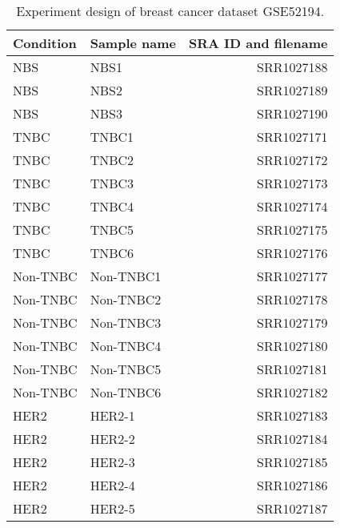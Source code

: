 \begin{table}[!htbp]
    \caption[Experiment design of breast cancer GSE52194]{
        Experiment design of breast cancer dataset GSE52194.
    }
    \label{tab:dataset-breast}
    \centering
    \begin{threeparttable}
        \begin{tabular}{llr}
            \toprule
            Condition & Sample name & SRA ID and filename \\
            \midrule
            NBS      & NBS1      & SRR1027188 \\
            NBS      & NBS2      & SRR1027189 \\
            NBS      & NBS3      & SRR1027190 \\
            TNBC     & TNBC1     & SRR1027171 \\
            TNBC     & TNBC2     & SRR1027172 \\
            TNBC     & TNBC3     & SRR1027173 \\
            TNBC     & TNBC4     & SRR1027174 \\
            TNBC     & TNBC5     & SRR1027175 \\
            TNBC     & TNBC6     & SRR1027176 \\
            Non-TNBC & Non-TNBC1 & SRR1027177 \\
            Non-TNBC & Non-TNBC2 & SRR1027178 \\
            Non-TNBC & Non-TNBC3 & SRR1027179 \\
            Non-TNBC & Non-TNBC4 & SRR1027180 \\
            Non-TNBC & Non-TNBC5 & SRR1027181 \\
            Non-TNBC & Non-TNBC6 & SRR1027182 \\
            HER2     & HER2-1    & SRR1027183 \\
            HER2     & HER2-2    & SRR1027184 \\
            HER2     & HER2-3    & SRR1027185 \\
            HER2     & HER2-4    & SRR1027186 \\
            HER2     & HER2-5    & SRR1027187 \\
            \bottomrule
        \end{tabular}
    \end{threeparttable}
\end{table}
